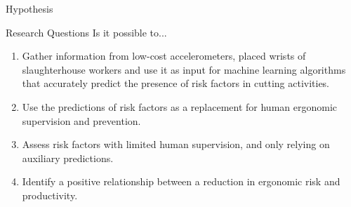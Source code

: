\begin{frame}{Hypothesis}
    \begin{alertblock}{Research Questions}
        Is it possible to...
    \begin{enumerate}%
    \item Gather information from low-cost accelerometers, placed wrists of slaughterhouse workers and use it as input for machine learning algorithms that accurately predict the presence of risk factors in cutting activities.
    \item Use the predictions of risk factors as a replacement for human ergonomic supervision and prevention.
    \item Assess risk factors with limited human supervision, and only relying on auxiliary predictions.
    \item Identify a positive relationship between a reduction in ergonomic risk and productivity.
    \end{enumerate}
    \end{alertblock}
\end{frame}
























